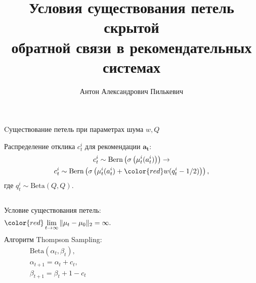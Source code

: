 \documentclass{beamer}
\title[\hbox to 56mm{Петли скрытой обратной связи}]{ Условия существования петель скрытой \\ обратной связи в рекомендательных системах }
\author[А.\,А. Пилькевич]{Антон Александрович Пилькевич}
\institute{Московский физико-технический институт}
\date{\footnotesize
\par\smallskip\emph{Курс:} Автоматизация научных исследований\par (практика, В.\,В.~Стрижов)/Группа 813
\par\smallskip\emph{Эксперт:} А.\,С.~Хританков
\par\smallskip\emph{Консультант:} А.\,С.~Хританков
\par\bigskip\small 2021}
\begin{document}
\begin{frame}
\thispagestyle{empty}
\maketitle
\end{frame}
\begin{frame}{Cуществование петель при параметрах шума $w, Q$}

Распределение отклика $c_t^i$ для рекомендации $\mathbf{a_t}$:
\begin{gather*}
  c_t^i \sim \text{Bern} \left(\sigma\left( \mu_t^i (a_t^i) \right) \right) \to \\
  c_t^i \sim \text{Bern} \left(\sigma\left( \mu_t^i (a_t^i) + \mathbin{\color{red}w (q_t^i -1/2)} \right) \right), 
\end{gather*}
где $q_t^i \sim \text{Beta}(Q, Q)$. 

\bigskip
\begin{columns}[c]
Условие существования петель: 
\begin{gather*}
  \color{red} \lim_{t \to \infty} \|\mu_t - \mu_0 \|_2 = \infty.
\end{gather*}
Алгоритм Thompson Sampling:
\begin{gather*}
\text{Beta}(\alpha_t, \beta_t), \\ 
\alpha_{t+1} = \alpha_t + c_t, \\ 
\beta_{t+1} = \beta_t + 1 - c_t
\end{gather*}
\end{columns}
\end{frame}
\end{document}
